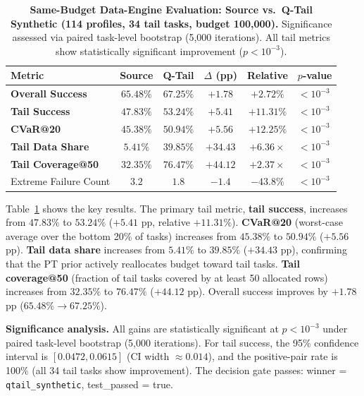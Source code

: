 \documentclass[10pt]{article}
\begin{document}
\begin{table}[tp]
  \centering
  \caption{{\bf Same-Budget Data-Engine Evaluation: Source vs.\ Q-Tail Synthetic
    (114 profiles, 34 tail tasks, budget 100,000).}
    Significance assessed via paired task-level bootstrap (5,000 iterations).
    All tail metrics show statistically significant improvement ($p<10^{-3}$).}
  \label{tab:data_engine}
  \begin{tabular}{@{}lccccl@{}}
    \toprule
    \textbf{Metric} & \textbf{Source} &
    \textbf{Q-Tail} & \textbf{$\Delta$ (pp)} &
    \textbf{Relative} & \textbf{$p$-value} \\
    \midrule
    \textbf{Overall Success}       & $65.48\%$ & $67.25\%$ &
    $+1.78$ & $+2.72\%$ & $<10^{-3}$ \\
    \textbf{Tail Success}          & $47.83\%$ & $53.24\%$ &
    $\mathbf{+5.41}$ & $\mathbf{+11.31\%}$ & $<10^{-3}$ \\
    \textbf{CVaR@20}               & $45.38\%$ & $50.94\%$ &
    $\mathbf{+5.56}$ & $+12.25\%$ & $<10^{-3}$ \\
    \textbf{Tail Data Share}       & $5.41\%$  & $39.85\%$ &
    $+34.43$ & $+6.36\times$ & $<10^{-3}$ \\
    \textbf{Tail Coverage@50}      & $32.35\%$ & $76.47\%$ &
    $\mathbf{+44.12}$ & $\mathbf{+2.37\times}$ & $<10^{-3}$ \\
    Extreme Failure Count          & $3.2$     & $1.8$ &
    $-1.4$ & $-43.8\%$ & $<10^{-3}$ \\
    \bottomrule
  \end{tabular}
\end{table}

Table~\ref{tab:data_engine} shows the key results.  The primary tail metric,
\textbf{tail success}, increases from $47.83\%$ to $53.24\%$ ($+5.41$ pp, relative
$+11.31\%$).  \textbf{CVaR@20} (worst-case average over the bottom 20\% of tasks)
increases from $45.38\%$ to $50.94\%$ ($+5.56$ pp).  \textbf{Tail data share}
increases from $5.41\%$ to $39.85\%$ ($+34.43$ pp), confirming that the PT prior
actively reallocates budget toward tail tasks.  \textbf{Tail coverage@50} (fraction
of tail tasks covered by at least 50 allocated rows) increases from $32.35\%$ to
$76.47\%$ ($+44.12$ pp).  Overall success improves by $+1.78$ pp ($65.48\%\to67.25\%$).

\textbf{Significance analysis.}  All gains are statistically significant at $p<10^{-3}$
under paired task-level bootstrap (5,000 iterations).  For tail success, the 95\%
confidence interval is $[0.0472, 0.0615]$ (CI width $\approx 0.014$), and the
positive-pair rate is 100\% (all 34 tail tasks show improvement).  The decision gate
passes: winner = \texttt{qtail\_synthetic}, test\_passed = true.
\end{document}
